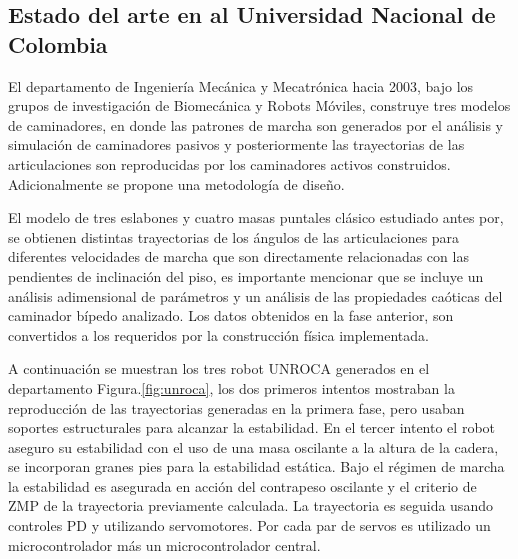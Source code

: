 \subsection[Estado del arte UN]{Estado del arte en al Universidad Nacional de Colombia}
\label{sec:estadoUN}
El departamento de Ingenier\'ia Mec\'anica y Mecatr\'onica hacia 2003, bajo los grupos de investigaci\'on de Biomec\'anica y Robots M\'oviles, construye tres modelos de caminadores, en donde las patrones de marcha son generados por el an\'alisis y simulaci\'on de caminadores pasivos y posteriormente las trayectorias de las articulaciones son reproducidas por los caminadores activos construidos. Adicionalmente se propone una metodolog\'ia de dise\~no\cite{Heredia2007}.\par
El modelo de tres eslabones y cuatro masas puntales cl\'asico estudiado antes por\cite{McGeer1990a}, se obtienen distintas trayectorias de los \'angulos de las articulaciones para diferentes velocidades de marcha que son directamente relacionadas con las pendientes de inclinaci\'on del piso\cite{M2005}, es importante mencionar que se incluye un an\'alisis adimensional de parámetros y un an\'alisis de las propiedades ca\'oticas del caminador bípedo analizado\cite{M2005a}. Los datos obtenidos en la fase anterior, son convertidos a los requeridos por la construcci\'on f\'isica implementada.\par
A continuaci\'on se muestran los tres robot UNROCA generados en el departamento Figura.\ref{fig:unroca}, los dos primeros intentos mostraban la reproducci\'on de las trayectorias generadas en la primera fase, pero usaban soportes estructurales para alcanzar la estabilidad. En el tercer intento el robot aseguro su estabilidad con el uso de una masa oscilante a la altura de la cadera, se incorporan granes pies para la estabilidad est\'atica. Bajo el r\'egimen de marcha la estabilidad es asegurada en acci\'on del contrapeso oscilante y el criterio de ZMP de la trayectoria previamente calculada. La trayectoria es seguida usando controles PD y utilizando servomotores. Por cada par de servos es utilizado un microcontrolador m\'as un microcontrolador central\cite{M2005}.
